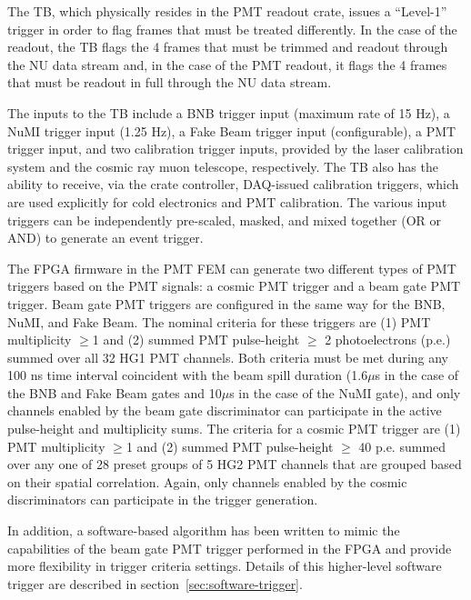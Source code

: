 The TB, which physically resides in the PMT readout crate, issues a ``Level-1'' trigger in order to flag frames that must be treated differently. In the case of the \lartpc readout, the TB flags the 4 frames that must be trimmed and readout through the NU data stream and, in the case of the PMT readout, it flags the 4 frames that must be readout in full through the NU data stream.

The inputs to the TB include a BNB trigger input (maximum rate of 15 Hz), a NuMI trigger input (1.25 Hz), a Fake Beam trigger input (configurable), a PMT trigger input, and two calibration trigger inputs, provided by the laser calibration system and the cosmic ray muon telescope, respectively. The TB also has the ability to receive, via the crate controller, DAQ-issued calibration triggers, which are used explicitly for cold electronics and PMT calibration. The various input triggers can be independently pre-scaled, masked, and mixed together (OR or AND) to generate an event trigger.

The FPGA firmware in the PMT FEM can generate two different types of PMT triggers based on the PMT signals: a cosmic PMT trigger and a beam gate PMT trigger. Beam gate PMT triggers are configured in the same way for the BNB, NuMI, and Fake Beam. The nominal criteria for these triggers are (1) PMT multiplicity $\ge$1 and (2) summed PMT pulse-height $\ge$ 2 photoelectrons (p.e.) summed over all 32 HG1 PMT channels. Both criteria must be met during any 100 ns time interval coincident with the beam spill duration (1.6$\mu$s in the case of the BNB and Fake Beam gates and 10$\mu$s in the case of the NuMI gate), and only channels enabled by the beam gate discriminator can participate in the active pulse-height and multiplicity sums. The criteria for a cosmic PMT trigger are (1) PMT multiplicity $\ge$1 and (2) summed PMT pulse-height $\ge$ 40 p.e. summed over any one of 28 preset groups of 5 HG2 PMT channels that are grouped based on their spatial correlation. Again, only channels enabled by the cosmic discriminators can participate in the trigger generation.

In addition, a software-based algorithm has been written to mimic the capabilities of the beam gate PMT trigger performed in the FPGA and provide more flexibility in trigger criteria settings. Details of this higher-level software trigger are described in section~\ref{sec:software-trigger}.


